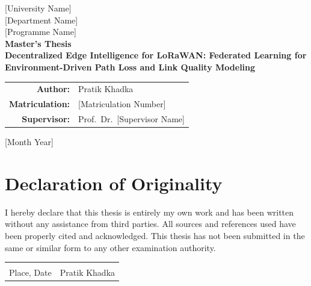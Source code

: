 \documentclass[12pt, a4paper, twoside, openright]{report}
\newcommand{\thesistitle}{Decentralized Edge Intelligence for LoRaWAN: Federated Learning for Environment-Driven Path Loss and Link Quality Modeling}
\newcommand{\authorname}{Pratik Khadka}
\newcommand{\supervisorname}{Prof.\ Dr.\ [Supervisor Name]}
\newcommand{\universityname}{[University Name]}
\newcommand{\departmentname}{[Department Name]}
\newcommand{\programmename}{[Programme Name]}
\newcommand{\matrikelnr}{[Matriculation Number]}
\newcommand{\submissiondate}{[Month Year]}
\begin{document}

\begin{titlepage}
  \centering\vspace*{1cm}
  {\large \universityname}\\[0.3cm]
  {\large \departmentname}\\[0.3cm]
  {\large \programmename}\\[2cm]
  {\Large \textbf{Master's Thesis}}\\[1.5cm]
  {\LARGE \bfseries \thesistitle}\\[2cm]
  \begin{tabular}{rl}
    \textbf{Author:}        & \authorname \\[0.3cm]
    \textbf{Matriculation:} & \matrikelnr \\[0.3cm]
    \textbf{Supervisor:}    & \supervisorname \\[0.3cm]
  \end{tabular}
  \vfill
  {\large \submissiondate}
\end{titlepage}

\chapter*{Declaration of Originality}
I hereby declare that this thesis is entirely my own work and has been written without any assistance from third parties. All sources and references used have been properly cited and acknowledged. This thesis has not been submitted in the same or similar form to any other examination authority.
\vspace{2cm}
\noindent\begin{tabular}{p{6cm} p{6cm}}
  \hrulefill & \hrulefill \\ Place, Date & \authorname
\end{tabular}
\clearpage

\end{document}
